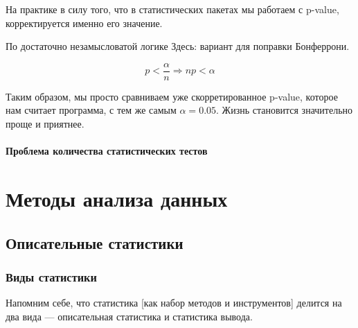 \documentclass[
  letterpaper,
  DIV=11,
  numbers=noendperiod]{scrreprt}
\theoremstyle{definition}
\theoremstyle{remark}
\begin{document}
На практике в силу того, что в статистических пакетах мы работаем с
p-value, корректируется именно его значение.

По достаточно незамысловатой логике Здесь: вариант для поправки
Бонферрони.

\[
p < \frac{\alpha}{n} \Rightarrow np < \alpha
\]

Таким образом, мы просто сравниваем уже скорретированное p-value,
которое нам считает программа, с тем же самым \(\alpha = 0.05\). Жизнь
становится значительно проще и приятнее.

\subsection{Проблема количества статистических
тестов}\label{stats-testing-multiple-testing}

\part{Методы анализа данных}


\chapter{Описательные статистики}\label{andan-descriptives}

\section{Виды статистики}\label{andan-descriptives-kinds-of-stats}

Напомним себе, что статистика {[}как набор методов и инструментов{]}
делится на два вида --- описательная статистика и статистика вывода.
\end{document}
